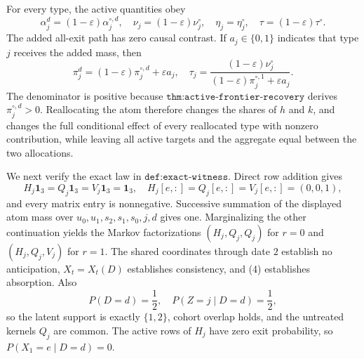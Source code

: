 For every type, the active quantities obey
\[
 \alpha_j^d=(1-\varepsilon)\alpha_j^{\circ,d},\quad
 \nu_j=(1-\varepsilon)\nu_j^\circ,\quad
 \eta_j=\eta_j^\circ,\quad
 \tau=(1-\varepsilon)\tau^\circ.
\tag{2}
\]
The added all-exit path has zero causal contrast.  If \(a_j\in\{0,1\}\) indicates that type \(j\) receives the added mass, then
\[
 \pi_j^d=(1-\varepsilon)\pi_j^{\circ,d}+\varepsilon a_j,
 \quad
 \tau_j=\frac{(1-\varepsilon)\nu_j^\circ}
 {(1-\varepsilon)\pi_j^{\circ,1}+\varepsilon a_j}.
\tag{3}
\]
The denominator is positive because \(\texttt{thm:active-frontier-recovery}\) derives \(\pi_j^{\circ,d}>0\).  Reallocating the atom therefore changes the shares of \(h\) and \(k\), and changes the full conditional effect of every reallocated type with nonzero contribution, while leaving all active targets and the aggregate equal between the two allocations.

We next verify the exact law in \(\texttt{def:exact-witness}\).  Direct row addition gives
\[
 H_j\mathbf1_3=Q_j\mathbf1_3=V_j\mathbf1_3=\mathbf1_3,
 \quad
 H_j[e,:]=Q_j[e,:]=V_j[e,:]=(0,0,1),
\tag{4}
\]
and every matrix entry is nonnegative.  Successive summation of the displayed atom mass over \(u_0,u_1,s_2,s_1,s_0,j,d\) gives one.  Marginalizing the other continuation yields the Markov factorizations \((H_j,Q_j,Q_j)\) for \(r=0\) and \((H_j,Q_j,V_j)\) for \(r=1\).  The shared coordinates through date \(2\) establish no anticipation, \(X_t=X_t(D)\) establishes consistency, and (4) establishes absorption.  Also
\[
 P(D=d)=\frac12,\quad P(Z=j\mid D=d)=\frac12,
\tag{5}
\]
so the latent support is exactly \(\{1,2\}\), cohort overlap holds, and the untreated kernels \(Q_j\) are common.  The active rows of \(H_j\) have zero exit probability, so \(P(X_1=e\mid D=d)=0\).

